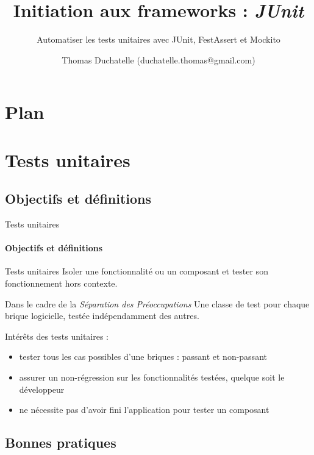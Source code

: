\documentclass[compress]{beamer}%
\title{Initiation aux frameworks : \emph{JUnit}}
\subtitle{Automatiser les tests unitaires avec JUnit, FestAssert et Mockito}
\author{Thomas Duchatelle (duchatelle.thomas@gmail.com)}
\institute{Capgemini, pour Yves Rocher}
\begin{document}
\frame{\titlepage}
  
\section*{Plan}
\frame{\tableofcontents[hideallsubsections]}



\section{Tests unitaires}

\subsection{Objectifs et définitions}

\begin{frame}{Tests unitaires}
	\framesubtitle{Objectifs et définitions}
	
	\begin{block}{Tests unitaires}
		Isoler une fonctionnalité ou un composant et tester son fonctionnement hors contexte. 
	\end{block}
	
	\pause
	\begin{block}{Dans le cadre de la \emph{Séparation des Préoccupations}}
		Une classe de test pour chaque brique logicielle, testée indépendamment des autres.
	\end{block}
	
\end{frame}

\begin{frame}
	
	Intérêts des tests unitaires :
	\begin{itemize}[<+->]
	\item tester tous les cas possibles d'une briques : passant et non-passant
	\item assurer un non-régression sur les fonctionnalités testées, quelque soit le développeur
	\item ne nécessite pas d'avoir fini l'application pour tester un composant
	\end{itemize}
	
\end{frame}

\subsection{Bonnes pratiques}
\end{document}
